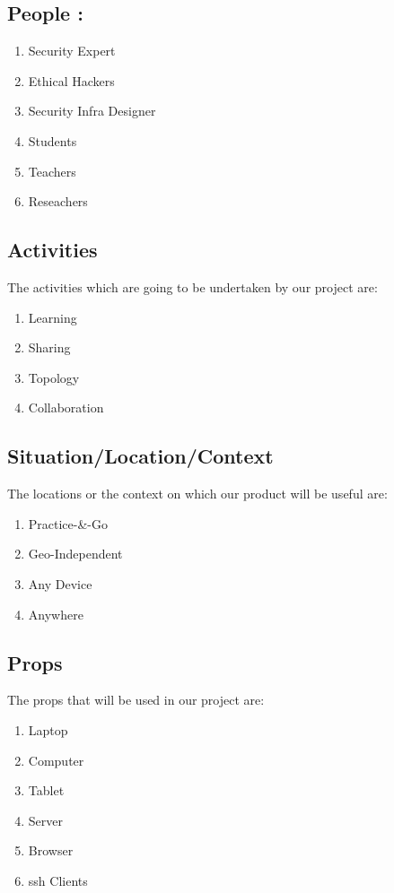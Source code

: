 \documentclass[12pt,a4paper,final,oneside]{report}
\begin{document}
	\subsection{People :}
	\textbf{}
	\begin{enumerate}
	\item Security Expert
	\item Ethical Hackers
	\item Security Infra Designer
	\item Students
	\item Teachers
	\item Reseachers	
	\end{enumerate}
	\subsection{Activities}
 \textbf{}
 The activities which are going to be undertaken by our project are:
	\begin{enumerate}
	\item Learning
	\item Sharing
	\item Topology
	\item Collaboration
	\end{enumerate}
	\subsection{Situation/Location/Context}
	The locations or the context on which our product will be useful are:
	\textbf{}
	\begin{enumerate}
	\item Practice-\&-Go
	\item Geo-Independent
	\item Any Device
	\item Anywhere
	\end{enumerate}
	\subsection{Props}
	\textbf{}
The props that will be used in our project are:
\begin{enumerate}
\item Laptop
\item Computer
\item Tablet
\item Server
\item Browser
\item ssh Clients
\end{enumerate}
\newpage
	\raggedright
\end{document}
